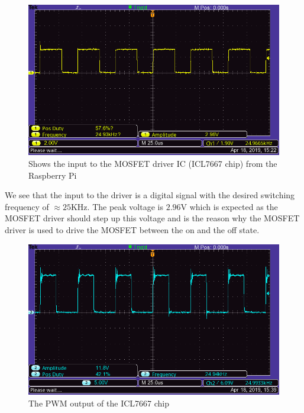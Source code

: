 \documentclass[a4paper, 12pt]{article}
\begin{document}
\begin{figure}[H]
  \centering
  \includegraphics[width=\textwidth]{images/pwm_input_from_pi.png}
  \caption{Shows the input to the MOSFET driver IC (ICL7667 chip) from the Raspberry Pi}
  \label{fig:pwm_input_from_pi}
\end{figure}

We see that the input to the driver is a digital signal with the desired
switching frequency of $\approx 25$KHz. The peak voltage is $2.96$V which is
expected as the MOSFET driver should step up this voltage and is the reason why
the MOSFET driver is used to drive the MOSFET between the on and the off state.

\begin{figure}[H]
  \centering
  \includegraphics[width=\textwidth]{images/pwm_output_from_chip.png}
  \caption{The PWM output of the ICL7667 chip}
  \label{fig:pwm_output_from_chip}
\end{figure}
\end{document}
